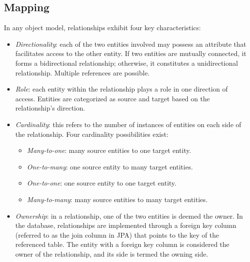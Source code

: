 \subsection{Mapping}
In any object model, relationships exhibit four key characteristics:
\begin{itemize}
    \item \textit{Directionality}: each of the two entities involved may possess an attribute that facilitates access to the other entity.
        If two entities are mutually connected, it forms a bidirectional relationship; otherwise, it constitutes a unidirectional relationship.
        Multiple references are possible.
    \item \textit{Role}: each entity within the relationship plays a role in one direction of access. 
        Entities are categorized as source and target based on the relationship's direction.
    \item \textit{Cardinality}: this refers to the number of instances of entities on each side of the relationship.
        Four cardinality possibilities exist: 
        \begin{itemize}
            \item \textit{Many-to-one}: many source entities to one target entity.
            \item \textit{One-to-many}: one source entity to many target entities.
            \item \textit{One-to-one}: one source entity to one target entity.
            \item \textit{Many-to-many}: many source entities to many target entities.
        \end{itemize}
    \item \textit{Ownership}: in a relationship, one of the two entities is deemed the owner.
        In the database, relationships are implemented through a foreign key column (referred to as the join column in JPA) that points to the key of the referenced table. 
        The entity with a foreign key column is considered the owner of the relationship, and its side is termed the owning side.
\end{itemize}

